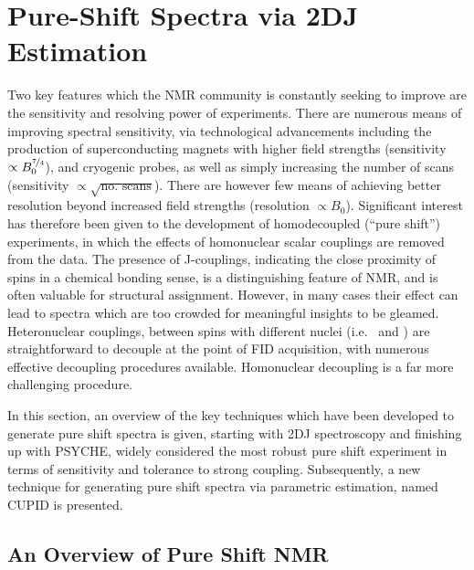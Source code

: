 \section{Pure-Shift Spectra via \acl{2DJ} Estimation}
\label{sec:pure-shift}

Two key features which the \ac{NMR} community is constantly seeking to improve
are the sensitivity and resolving power of experiments. There are
numerous means of improving spectral sensitivity, via technological
advancements including the production of superconducting magnets with higher
field strengths\cite{Maeda2019} (sensitivity $\propto B_0^{\nicefrac{7}{4}}$),
and cryogenic probes\cite{Styles1984,Styles1989,Kovacs2005}, as well as simply increasing the number
of scans (sensitivity $\propto \sqrt{\text{no. scans}}$). There are however
few means of achieving better resolution beyond increased field strengths
(resolution $\propto B_0$). Significant interest has therefore been
given to the development of homodecoupled (``pure shift'')
experiments\cite{Meyer2013,Adams2014,Zangger2015}, in which the
effects of homonuclear scalar couplings are removed from the data. The presence
of J-couplings, indicating the close proximity of spins in a chemical
bonding sense, is a distinguishing feature of \ac{NMR}, and is often valuable for
structural assignment. However, in many cases their effect can lead to spectra
which are too crowded for meaningful insights to be gleamed.  Heteronuclear
couplings, between spins with different nuclei (i.e. \proton\ and \carbon) are straightforward to decouple at the point of \ac{FID} acquisition, with numerous effective decoupling procedures available\cite{Shaka1983a, Shaka1983b,Shaka1985}. Homonuclear decoupling is a far more challenging procedure.

In this section, an overview of the key techniques which have
been developed to generate pure shift spectra is given, starting with \ac{2DJ}
spectroscopy and finishing up with \ac{PSYCHE}, widely considered the most
robust pure shift experiment in terms of sensitivity and tolerance to strong
coupling. Subsequently, a new technique for generating pure shift spectra via
parametric estimation, named \acf{CUPID} is presented.

\subsection{An Overview of Pure Shift NMR}

